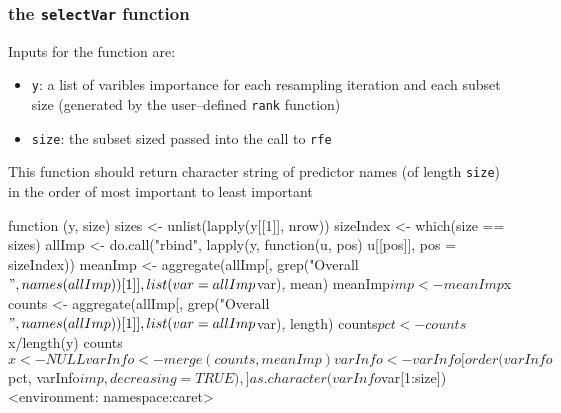 \documentclass[12pt]{article}
\begin{document}
\begin{Schunk}
\end{Schunk}

\subsubsection{the \texttt{selectVar} function}

Inputs for the function are:
\begin{itemize}
\item \texttt{y}: a list of varibles importance for each resampling iteration and each subset size (generated by the user--defined \texttt{rank} function)
\item \texttt{size}: the subset sized passed into the call to \texttt{rfe}
\end{itemize}

This function should return character string of predictor names (of length \texttt{size}) in the order of most important to least important

\begin{Schunk}
\begin{Soutput}
function (y, size) 
{
    sizes <- unlist(lapply(y[[1]], nrow))
    sizeIndex <- which(size == sizes)
    allImp <- do.call("rbind", lapply(y, function(u, pos) u[[pos]], 
        pos = sizeIndex))
    meanImp <- aggregate(allImp[, grep("Overall$", names(allImp))[1]], 
        list(var = allImp$var), mean)
    meanImp$imp <- meanImp$x
    counts <- aggregate(allImp[, grep("Overall$", names(allImp))[1]], 
        list(var = allImp$var), length)
    counts$pct <- counts$x/length(y)
    counts$x <- NULL
    varInfo <- merge(counts, meanImp)
    varInfo <- varInfo[order(varInfo$pct, varInfo$imp, decreasing = TRUE), 
        ]
    as.character(varInfo$var[1:size])
}
<environment: namespace:caret>
\end{Soutput}
\end{Schunk}
\end{document}
